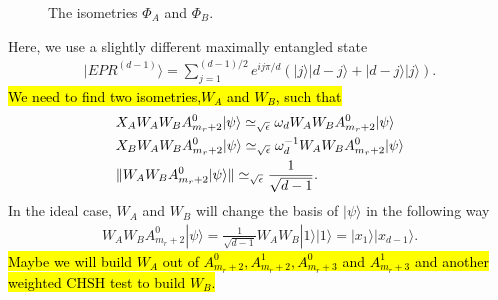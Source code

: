 \documentclass[11pt,letterpaper]{article}
\newcommand{\ket}[1]{|#1\rangle}
\DeclarePairedDelimiter{\norm}{\lVert}{\rVert}
\newcommand{\1}{\mathbb{1}}
\newcommand{\EPR}[1]{EPR^{(#1)}}
\newcommand{\appd}[1]{\simeq_{#1}}
\theoremstyle{definition}
\begin{document}
\begin{figure}[H]
	\caption{The isometries $\Phi_A$ and $\Phi_B$.}
\end{figure}
Here, we use a slightly different maximally entangled state
\begin{align}
\ket{\EPR{d-1}} = \sum_{j=1}^{(d-1)/2} e^{ij\pi/d}( \ket{j}\ket{d-j} + \ket{d-j}\ket{j}).
\end{align} 
\hl{We need to find two isometries,$W_A$ and $W_B$, such that}
\begin{align}
	\label{eq:xa_eig} &X_A W_AW_B A_{m_r+2}^0\ket{\psi} \appd{\sqrt{\epsilon}} \omega_d W_AW_BA_{m_r+2}^0 \ket{\psi} \\
	\label{eq:xb_eig} &X_B W_AW_BA_{m_r+2}^0 \ket{\psi} \appd{\sqrt{\epsilon}} \omega_d^{-1} W_AW_BA_{m_r+2}^0 \ket{\psi} \\
	\label{eq:norm} &\norm{W_AW_B A_{m_r+2}^0\ket{\psi}} \appd{\sqrt{\epsilon}} \frac{1}{\sqrt{d-1}}.
\end{align}
In the ideal case, $W_A$ and $W_B$ will change the basis of $\ket{\psi}$ in the following way
\begin{align}
	W_AW_B A_{m_r+2}^0 \ket{\psi} = \frac{1}{\sqrt{d-1}} W_AW_B \ket{1}\ket{1} = \ket{x_1}\ket{x_{d-1}}.
\end{align}
\hl{Maybe we will build $W_A$ out of $A_{m_r+2}^0, A_{m_r+2}^1, A_{m_r+3}^0$ and $A_{m_r+3}^1$ and
another weighted CHSH test to build $W_B$.}
\end{document}
